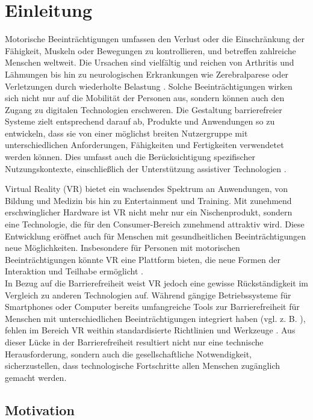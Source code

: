 \chapter{Einleitung}
\label{chap:Einleitung}

Motorische Beeinträchtigungen umfassen den Verlust oder die Einschränkung der Fähigkeit, Muskeln oder Bewegungen zu kontrollieren, und betreffen zahlreiche Menschen weltweit. Die Ursachen sind vielfältig und reichen von Arthritis und Lähmungen bis hin zu neurologischen Erkrankungen wie Zerebralparese oder Verletzungen durch wiederholte Belastung \citep{yuan_game_2011}. Solche Beeinträchtigungen wirken sich nicht nur auf die Mobilität der Personen aus, sondern können auch den Zugang zu digitalen Technologien erschweren. Die Gestaltung barrierefreier Systeme zielt entsprechend darauf ab, Produkte und Anwendungen so zu entwickeln, dass sie von einer möglichst breiten Nutzergruppe mit unterschiedlichen Anforderungen, Fähigkeiten und Fertigkeiten verwendetet werden können. Dies umfasst auch die Berücksichtigung spezifischer Nutzungskontexte, einschließlich der Unterstützung assistiver Technologien \citep{DINISO9241}. 

Virtual Reality (VR) bietet ein wachsendes Spektrum an Anwendungen, von Bildung und Medizin bis hin zu Entertainment und Training. Mit zunehmend erschwinglicher Hardware ist VR nicht mehr nur ein Nischenprodukt, sondern eine Technologie, die für den Consumer-Bereich zunehmend attraktiv wird. Diese Entwicklung eröffnet auch für Menschen mit gesundheitlichen Beeinträchtigungen neue Möglichkeiten. Insbesondere für Personen mit motorischen Beeinträchtigungen könnte VR eine Plattform bieten, die neue Formen der Interaktion und Teilhabe ermöglicht \citep{10.1145/3373625.3416998}.\\
In Bezug auf die Barrierefreiheit weist VR jedoch eine gewisse Rückständigkeit im Vergleich zu anderen Technologien auf. Während gängige Betriebssysteme für Smartphones oder Computer bereits umfangreiche Tools zur Barrierefreiheit für Menschen mit unterschiedlichen Beeinträchtigungen integriert haben (vgl. z. B. \citep{apple_einfuhrung_2024-2}), fehlen im Bereich VR weithin standardisierte Richtlinien und Werkzeuge \citep{ciccone_next_2023}. Aus dieser Lücke in der Barrierefreiheit resultiert nicht nur eine technische Herausforderung, sondern auch die gesellschaftliche Notwendigkeit, sicherzustellen, dass technologische Fortschritte allen Menschen zugänglich gemacht werden.

\section{Motivation}

